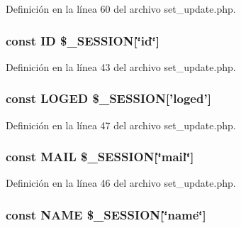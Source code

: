Definición en la línea 60 del archivo set\-\_\-update.\-php.

\hypertarget{set__update_8php_a0242c89b204631bde9edc65a9a731f47}{
\subsubsection[{I\-D}]{\setlength{\rightskip}{0pt plus 5cm}const I\-D \$\-\_\-\-S\-E\-S\-S\-I\-O\-N\mbox{[}\char`\"{}id\char`\"{}\mbox{]}}}\label{set__update_8php_a0242c89b204631bde9edc65a9a731f47}


Definición en la línea 43 del archivo set\-\_\-update.\-php.

\hypertarget{set__update_8php_a2c67e1e38c1ba2b45b1fb652313c6d22}{
\subsubsection[{L\-O\-G\-E\-D}]{\setlength{\rightskip}{0pt plus 5cm}const L\-O\-G\-E\-D \$\-\_\-\-S\-E\-S\-S\-I\-O\-N\mbox{[}'loged'\mbox{]}}}\label{set__update_8php_a2c67e1e38c1ba2b45b1fb652313c6d22}


Definición en la línea 47 del archivo set\-\_\-update.\-php.

\hypertarget{set__update_8php_a347ad8be6c67745f0c0fac9638a0eec2}{
\subsubsection[{M\-A\-I\-L}]{\setlength{\rightskip}{0pt plus 5cm}const M\-A\-I\-L \$\-\_\-\-S\-E\-S\-S\-I\-O\-N\mbox{[}\char`\"{}mail\char`\"{}\mbox{]}}}\label{set__update_8php_a347ad8be6c67745f0c0fac9638a0eec2}


Definición en la línea 46 del archivo set\-\_\-update.\-php.

\hypertarget{set__update_8php_a244352f035b82b20b0efa506167fd862}{
\subsubsection[{N\-A\-M\-E}]{\setlength{\rightskip}{0pt plus 5cm}const N\-A\-M\-E \$\-\_\-\-S\-E\-S\-S\-I\-O\-N\mbox{[}\char`\"{}name\char`\"{}\mbox{]}}}\label{set__update_8php_a244352f035b82b20b0efa506167fd862}


